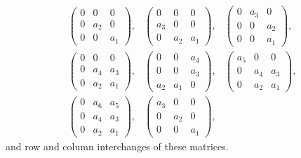 \documentclass[nofootinbib,showpacs]{revtex4}
\begin{document}
\begin{eqnarray}\label{twoevals}
\left(\begin{array}{ccc}0&0&0\\0&a_2&0\\0&0&a_1\end{array}\right),& 
\left(\begin{array}{ccc}0&0&0\\a_3&0&0\\0&a_2&a_1\end{array}\right),& 
\left(\begin{array}{ccc}0&a_3&0\\0&0&a_2\\0&0&a_1\end{array}\right),\\
\left(\begin{array}{ccc}0&0&0\\0&a_4&a_3\\0&a_2&a_1\end{array}\right),& 
\left(\begin{array}{ccc}0&0&a_4\\0&0&a_3\\a_2&a_1&0\end{array}\right),& 
\left(\begin{array}{ccc}a_5&0&0\\0&a_4&a_3\\0&a_2&a_1\end{array}\right),\nonumber\\ 
\left(\begin{array}{ccc}0&a_6&a_5\\0&a_4&a_3\\0&a_2&a_1\end{array}\right),& 
\left(\begin{array}{ccc}a_3&0&0\\0&a_2&0\\0&0&a_1\end{array}\right),\nonumber
\end{eqnarray} 
and row and column interchanges of these matrices.
\end{document}
